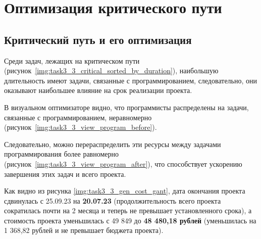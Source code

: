 \section{Оптимизация критического пути}

\subsection{Критический путь и его оптимизация}

Среди задач, лежащих на критическом пути (рисунок~\ref{img:task3_3_critical_sorted_by_duration}), наибольшую длительность имеют задачи, связанные с программированием, следовательно, они оказывают наибольшее влияние на срок 
реализации проекта.

В визуальном оптимизаторе видно, что программисты распределены на задачи, связанные с программированием, неравномерно (рисунок~\ref{img:task3_3_view_program_before}). 

Следовательно, можно перераспределить эти ресурсы между задачами программирования более равномерно (рисунок~\ref{img:task3_3_view_program_after}), что способствует ускорению завершения этих задач и всего проекта.

\newpage
Как видно из рисунка \ref{img:task3_3_gen_cost_gant}, дата окончания проекта сдвинулась с 25.09.23 на \textbf{20.07.23} (продолжительность всего проекта сократилась почти на 2 месяца и теперь не превышает установленного срока), а стоимость проекта уменьшилась с 49 849 до \textbf{48 480,18 рублей} (уменьшилась на 1 368,82 рублей и не превышает бюджета проекта).
